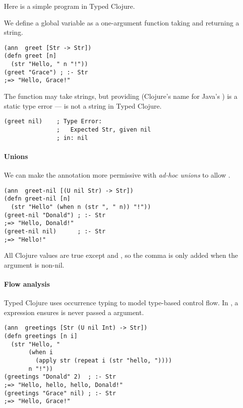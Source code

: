 Here is a simple program in Typed Clojure.

We define a global variable  as a one-argument function
taking and returning a string.

\begin{verbatim}
(ann  greet [Str -> Str])
(defn greet [n]
  (str "Hello, " n "!"))
(greet "Grace") ; :- Str
;=> "Hello, Grace!"
\end{verbatim}

The function may take strings, but providing  (Clojure's name for Java's )
is a static type error ---  is not a string in Typed Clojure.

\begin{verbatim}
(greet nil)    ; Type Error:
               ;   Expected Str, given nil
               ; in: nil
\end{verbatim}

\paragraph{Unions} We can make the annotation more permissive with \emph{ad-hoc unions}
to allow .

\begin{verbatim}
(ann  greet-nil [(U nil Str) -> Str])
(defn greet-nil [n]
  (str "Hello" (when n (str ", " n)) "!"))
(greet-nil "Donald") ; :- Str
;=> "Hello, Donald!"
(greet-nil nil)      ; :- Str
;=> "Hello!"
\end{verbatim}

All Clojure values are true except  and , so the
comma is only added when the argument is non-nil.

\paragraph{Flow analysis} Typed Clojure uses occurrence typing to
model type-based control flow.
In , a  expression ensures 
is never passed a  argument.

\begin{verbatim}
(ann  greetings [Str (U nil Int) -> Str])
(defn greetings [n i]
  (str "Hello, "
       (when i
         (apply str (repeat i (str "hello, "))))
       n "!"))
(greetings "Donald" 2)  ; :- Str
;=> "Hello, hello, hello, Donald!"
(greetings "Grace" nil) ; :- Str
;=> "Hello, Grace!"
\end{verbatim}

